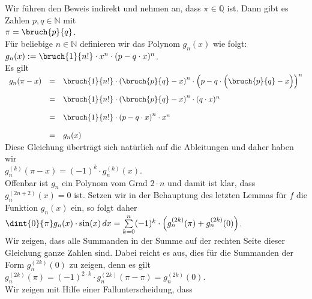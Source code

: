 \proof
Wir f\"uhren den Beweis indirekt und nehmen an, dass $\pi \in \mathbb{Q}$ ist.  Dann gibt es Zahlen
$p,q \in \mathbb{N}$ mit 
\\[0.2cm]
\hspace*{1.3cm}
$\pi = \bruch{p}{q}$.
\\[0.2cm]
F\"ur beliebige $n \in \mathbb{N}$ definieren wir das Polynom $g_n(x)$ wie folgt:
\\[0.2cm]
\hspace*{1.3cm}
$g_n(x) := \bruch{1}{n!} \cdot x^n \cdot (p - q \cdot x)^n$.
\\[0.2cm]
Es gilt
\\
\hspace*{1.3cm}
$
\begin{array}[t]{lcl}
  g_n(\pi - x) 
& = & 
 \bruch{1}{n!} \cdot \left(\bruch{p}{q} - x\right)^n \cdot 
  \left(p - q \cdot \Bigl(\bruch{p}{q} - x\Bigr)\right)^n    \\[0.4cm]
& = & 
 \bruch{1}{n!} \cdot \left(\bruch{p}{q} - x\right)^n \cdot (q \cdot x)^n    \\[0.4cm]
& = & 
 \bruch{1}{n!} \cdot \left(p - q \cdot x\right)^n \cdot x^n    \\[0.4cm]
& = & 
 g_n(x)   
\end{array}
$
\\[0.2cm]
Diese Gleichung \"ubertr\"agt sich nat\"urlich auf die Ableitungen und daher haben wir
\\[0.2cm]
\hspace*{1.3cm}
$g_n^{(k)}(\pi - x) = (-1)^k \cdot g_n^{(k)}(x)$.
\\[0.2cm]
Offenbar ist $g_n$ ein Polynom vom Grad $2 \cdot n$ und damit ist klar, dass $g_n^{(2n+2)}(x) = 0$ ist.
Setzen wir in der Behauptung des letzten Lemmas f\"ur $f$ die Funktion $g_n(x)$ ein, so folgt daher
\\[0.2cm]
\hspace*{1.3cm}
$\dint{0}{{\pi}} g_n(x) \cdot \sin(x)\, dx = 
  \sum\limits_{k=0}^n (-1)^k \cdot \Bigl(g_n^{(2k)}(\pi) + g_n^{(2k)}(0)\Bigr) 
$.
\\[0.2cm]
Wir zeigen, dass alle Summanden in der Summe auf der rechten Seite dieser Gleichung ganze Zahlen sind.
Dabei reicht es aus, dies f\"ur die Summanden der Form $g_n^{(2k)}(0)$ zu zeigen, denn es gilt
\\[0.2cm]
\hspace*{1.3cm}
$g_n^{(2k)}(\pi) = (-1)^{2\cdot k} \cdot g_n^{(2k)}(\pi - \pi) = g_n^{(2k)}(0)$.
\\[0.2cm]
Wir zeigen mit Hilfe einer Fallunterscheidung, dass    
